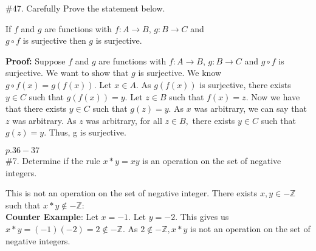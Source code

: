 \documentclass[11pt]{amsart}
\begin{document}
\#47. Carefully Prove the statement below.\\
\begin{center}
If $f$ and $g$ are functions with $f:A \to B$, $g:B \to C$ and \\  $g \circ f$ is surjective then $g$ is surjective.\\
\end{center}
\vskip 0.2in
\textbf{Proof:} Suppose $f$ and $g$ are functions with $f:A\to B$, $g:B\to C$ and $g\circ f$ is surjective. We want to show that $g$ is surjective. We know $g\circ f(x)=g(f(x)).$ Let $x\in A$. As $g(f(x))$ is surjective, there exists $y\in C$ such that $g(f(x))=y.$ Let $z\in B$ such that $f(x)=z$. Now we have that there exists $y\in C$ such that $g(z)=y$. As $x$ was arbitrary, we can say that $z$ was arbitrary. As $z$ was arbitrary, for all $z\in B,$ there exists $y\in C$ such that $g(z)=y$. Thus, g is surjective.


\vskip 0.4in

$p. 36-37$\\

\#7. Determine if the rule $x \ast y = xy$ is an operation on the set of negative integers.\\
\vskip 0.2in

This is not an operation on the set of negative integer. There exists $x,y \in \mathbb{-Z}$ such that $x\ast y \notin \mathbb{-Z}:$
\\

\textbf{Counter Example}: Let $x=-1$. Let $y=-2$. This gives us $x\ast y= (-1)(-2)=2\notin\mathbb{-Z}.$ As $2\notin\mathbb{-Z}, x\ast y$ is not an operation on the set of negative integers.
\end{document}

